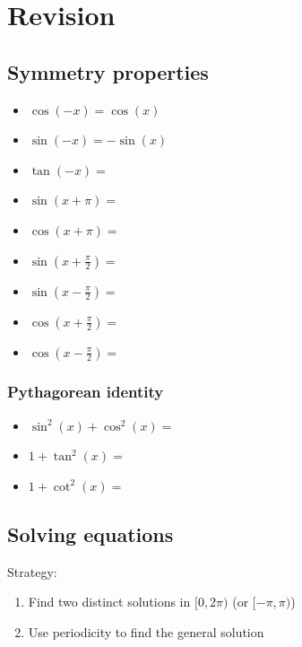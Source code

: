 \documentclass[12pt]{article}
\begin{document}
\section{Revision}
\subsection{Symmetry properties}



\begin{itemize}
    \item $\cos(-x) = \cos(x)$
    \item $\sin(-x) = -\sin(x)$
    \item $\tan(-x) = $
    \item $\sin(x+\pi) =$
    \item $\cos(x+\pi) =$
    \item $\sin(x + \frac{\pi}{2}) =$
    \item $\sin(x - \frac{\pi}{2}) =$
    \item $\cos(x + \frac{\pi}{2}) =$
    \item $\cos(x - \frac{\pi}{2}) =$
\end{itemize}

\subsubsection{Pythagorean identity}
\begin{itemize}
    \item $\sin^2(x) + \cos^2(x) = $
    \item $1 + \tan^2(x) = $
    \item $1 + \cot^2(x) = $
\end{itemize}

\subsection{Solving equations}
Strategy:
\begin{enumerate}
    \item Find two distinct solutions in $[0, 2\pi)$ (or $[-\pi, \pi)$)
    \item Use periodicity to find the general solution
\end{enumerate}
\end{document}
